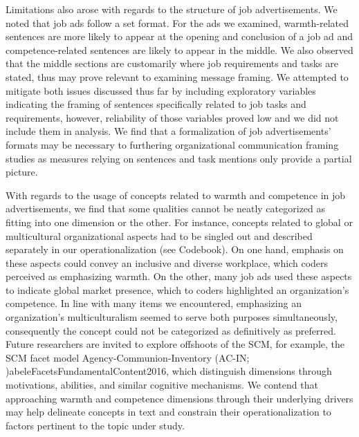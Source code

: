 \documentclass[Royal,sageapa,times]{sagej}
\begin{document}
Limitations also arose with regards to the structure of job advertisements. We noted that job ads follow a set format. For the ads we examined, warmth-related sentences are more likely to appear at the opening and conclusion of a job ad and competence-related sentences are likely to appear in the middle. We also observed that the middle sections are customarily where job requirements and tasks are stated, thus may prove relevant to examining message framing. We attempted to mitigate both issues discussed thus far by including exploratory variables indicating the framing of sentences specifically related to job tasks and requirements, however, reliability of those variables proved low and we did not include them in analysis. We find that a formalization of job advertisements’ formats may be necessary to furthering organizational communication framing studies as measures relying on sentences and task mentions only provide a partial picture.

With regards to the usage of concepts related to warmth and competence in job advertisements, we find that some qualities cannot be neatly categorized as fitting into one dimension or the other. For instance, concepts related to global or multicultural organizational aspects had to be singled out and described separately in our operationalization (see Codebook). On one hand, emphasis on these aspects could convey an inclusive and diverse workplace, which coders perceived as emphasizing warmth. On the other, many job ads used these aspects to indicate global market presence, which to coders highlighted an organization’s competence. In line with many items we encountered, emphasizing an organization’s multiculturalism seemed to serve both purposes simultaneously, consequently the concept could not be categorized as definitively as preferred. Future researchers are invited to explore offshoots of the SCM, for example, the SCM facet model Agency-Communion-Inventory \shortcite(AC-IN; ){abeleFacetsFundamentalContent2016}, which distinguish dimensions through motivations, abilities, and similar cognitive mechanisms. We contend that approaching warmth and competence dimensions through their underlying drivers may help delineate concepts in text and constrain their operationalization to factors pertinent to the topic under study.
\end{document}
